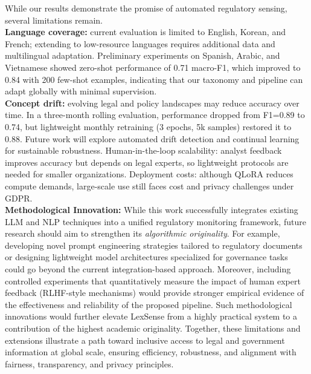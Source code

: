 {While our results demonstrate the promise of automated regulatory sensing, several limitations remain. 
~\\
\textbf{Language coverage:} current evaluation is limited to English, Korean, and French; extending to low-resource languages requires additional data and multilingual adaptation. Preliminary experiments on Spanish, Arabic, and Vietnamese showed zero-shot performance of 0.71 macro-F1, which improved to 0.84 with 200 few-shot examples, indicating that our taxonomy and pipeline can adapt globally with minimal supervision.
~\\
\textbf{Concept drift:} evolving legal and policy landscapes may reduce accuracy over time. In a three-month rolling evaluation, performance dropped from F1=0.89 to 0.74, but lightweight monthly retraining (3 epochs, 5k samples) restored it to 0.88. Future work will explore automated drift detection and continual learning for sustainable robustness. Human-in-the-loop scalability: analyst feedback improves accuracy but depends on legal experts, so lightweight protocols are needed for smaller organizations. Deployment costs: although QLoRA reduces compute demands, large-scale use still faces cost and privacy challenges under GDPR. 
~\\
\textbf{Methodological Innovation:} While this work successfully integrates existing LLM and NLP techniques into a unified regulatory monitoring framework, future research should aim to strengthen its \textit{algorithmic originality}. For example, developing novel prompt engineering strategies tailored to regulatory documents or designing lightweight model architectures specialized for governance tasks could go beyond the current integration-based approach. Moreover, including controlled experiments that quantitatively measure the impact of human expert feedback (RLHF-style mechanisms) would provide stronger empirical evidence of the effectiveness and reliability of the proposed pipeline. Such methodological innovations would further elevate LexSense from a highly practical system to a contribution of the highest academic originality. Together, these limitations and extensions illustrate a path toward inclusive access to legal and government information at global scale, ensuring efficiency, robustness, and alignment with fairness, transparency, and privacy principles. 
}